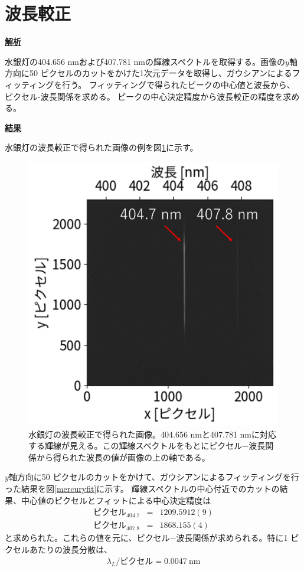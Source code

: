 \documentclass[a4paper,11pt,uplatex]{jsbook}
\begin{document}
\section{波長較正}
\noindent \textbf{\underline{解析}}\par
水銀灯の404.656 nmおよび407.781 nmの輝線スペクトルを取得する。画像の$y$軸方向に50 ピクセルのカットをかけた1次元データを取得し、ガウシアンによるフィッティングを行う。
フィッティングで得られたピークの中心値と波長から、ピクセル-波長関係を求める。
ピークの中心決定精度から波長較正の精度を求める。

\noindent \textbf{\underline{結果}}\par
水銀灯の波長較正で得られた画像の例を図\ref{mercury}に示す。
\begin{figure}[h]
  \centering
  \includegraphics[width=0.6\linewidth]{image/4-mercury.png}
  \caption[水銀灯の波長較正-1]{水銀灯の波長較正で得られた画像。404.656 nmと407.781 nmに対応する輝線が見える。この輝線スペクトルをもとにピクセル$-$波長関係から得られた波長の値が画像の上の軸である。}\label{mercury}
\end{figure}
$y$軸方向に50 ピクセルのカットをかけて、ガウシアンによるフィッティングを行った結果を図\ref{mercuryfit}に示す。
輝線スペクトルの中心付近でのカットの結果、中心値のピクセルとフィットによる中心決定精度は
\begin{eqnarray}
  ピクセル_{404.7} &=& 1209.5912(9)\\
  ピクセル_{407.8} &=& 1868.155(4) 
\end{eqnarray}
と求められた。これらの値を元に、ピクセル$-$波長関係が求められる。特に1 ピクセルあたりの波長分散は、
\begin{eqnarray}
  \lambda_L / ピクセル = 0.0047~\text{nm}
\end{eqnarray}
\end{document}
